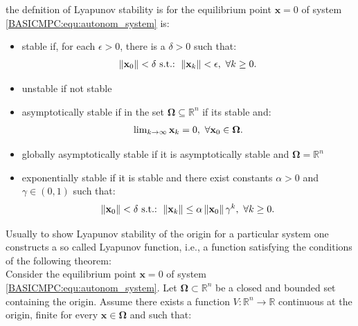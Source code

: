     the defnition of Lyapunov stability is for the equilibrium point $\textbf{x}=0$ of system \ref{BASICMPC:equ:autonom_system} is:
    \begin{itemize}
    \item stable if, for each $\epsilon>0$, there is a $\delta>0$ such that:
        \begin{equation}
        \begin{array}{c}
                \left\lVert\textbf{x}_0\right\rVert<\delta\textnormal{ s.t.: }\left\lVert\textbf{x}_k\right\rVert<\epsilon,\textnormal{ }\forall k\geq0.
            \end{array}
            \label{BASICMPC:equ:lyapunov_1}
        \end{equation}
        
    \item unstable if not stable
    
    \item asymptotically stable if in the set $\boldsymbol{\Omega}\subseteq\mathbb{R}^n$ if its stable and:
       \begin{equation}
        \begin{array}{c}
                \lim_{k\rightarrow\infty}\textbf{x}_k=0,\textnormal{ }\forall\textbf{x}_0\in\boldsymbol{\Omega}.
            \end{array}
            \label{BASICMPC:equ:lyapunov_2}
        \end{equation}
    
    \item globally asymptotically stable if it is asymptotically stable and $\boldsymbol{\Omega}=\mathbb{R}^n$
    
    \item exponentially stable if it is stable and there exist constants $\alpha>0$ and $\gamma\in(0,1)$ such that:
    \begin{equation}
        \begin{array}{c}
                \left\lVert\textbf{x}_0\right\rVert<\delta\textnormal{ s.t.: }\left\lVert\textbf{x}_k\right\rVert\leq\alpha\left\lVert\textbf{x}_0\right\rVert\gamma^k,\textnormal{ }\forall k\geq0.
            \end{array}
            \label{BASICMPC:equ:lyapunov_3}
        \end{equation}
    
    
    \end{itemize}
    
    Usually to show Lyapunov stability of the origin for a particular system one constructs a so called Lyapunov function, i.e., a function satisfying the conditions of the following theorem:\\
    Consider the equilibrium point $\textbf{x}=0$ of system \ref{BASICMPC:equ:autonom_system}. Let $\boldsymbol{\Omega}\subset\mathbb{R}^n$ be a closed and bounded set containing the origin. Assume there exists a function $V:\mathbb{R}^n\rightarrow\mathbb{R}$ continuous at the origin, finite for every $\textbf{x}\in\boldsymbol{\Omega}$ and such that:
    

